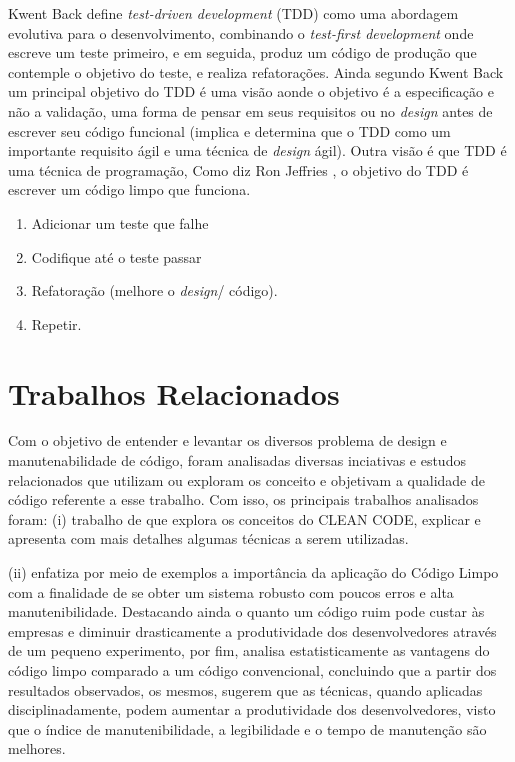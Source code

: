 \documentclass[12pt]{article}
\begin{document}
Kwent Back \cite{TDD_EXAMPLE} define \textit{test-driven development} (TDD) como uma abordagem evolutiva para o desenvolvimento, combinando o \textit{test-first development } onde escreve um teste primeiro, e em seguida, produz um código de produção que contemple o objetivo do teste, e realiza refatorações. Ainda segundo Kwent Back um principal objetivo do TDD é uma visão aonde o objetivo é a especificação e não a validação, uma forma de pensar em seus requisitos ou no \textit{design} antes de escrever seu código funcional (implica e determina que o TDD como um importante requisito ágil e uma técnica de \textit{design} ágil). Outra visão é que TDD é uma técnica de programação, Como diz Ron Jeffries \cite{CLEAN_CODE_TOO_MUCH_OF_A_GOOD_THING}, o objetivo do TDD é escrever um código limpo que funciona.

\begin{enumerate}
\item Adicionar um teste que falhe
\item Codifique até o teste passar
\item Refatoração (melhore o \textit{design}/ código).
\item Repetir.
\end{enumerate}

	
\part{Trabalhos Relacionados} \label{sec:trabalhosrelacionados}

Com o objetivo de entender e levantar os diversos problema de design e manutenabilidade de código, foram analisadas diversas inciativas e estudos relacionados que utilizam ou exploram os conceito e objetivam a qualidade de código referente a esse trabalho.
Com isso, os principais trabalhos analisados foram: (i) trabalho de \cite{TR_CLEAN_CODE_INTRODUCAO} que explora os conceitos do CLEAN CODE, explicar e apresenta com mais detalhes algumas técnicas a serem utilizadas.

 (ii) \cite{TR_CLEAN_CODE_IMPORTANCIA} enfatiza por meio de exemplos a importância da aplicação do
Código Limpo com a finalidade de se obter um sistema robusto com poucos erros e alta manutenibilidade. Destacando ainda o quanto um código ruim pode custar às empresas e diminuir drasticamente a produtividade dos desenvolvedores através de um pequeno experimento, por fim, analisa estatisticamente as vantagens do código limpo comparado a um código convencional, concluindo que a partir dos resultados observados, os mesmos, sugerem que as técnicas, quando aplicadas disciplinadamente, podem aumentar a produtividade dos desenvolvedores, visto que o índice de manutenibilidade, a legibilidade e o tempo de manutenção são melhores.
 
\end{document}
